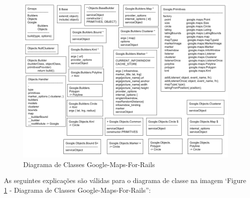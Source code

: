 \begin{figure}[ht]
  \includegraphics[scale=0.48]{images/diagrama_de_classes_google_maps_for_rails.png}
  \caption{Diagrama de Classes Google-Maps-For-Rails}
  \label{fig:diagrama_de_classes_google_maps_for_rails}
\end{figure}

As seguintes explicações são válidas para o diagrama de classe na imagem ‘Figure 
\ref{fig:diagrama_de_classes_google_maps_for_rails} - Diagrama de Classes Google-Maps-For-Rails'':

